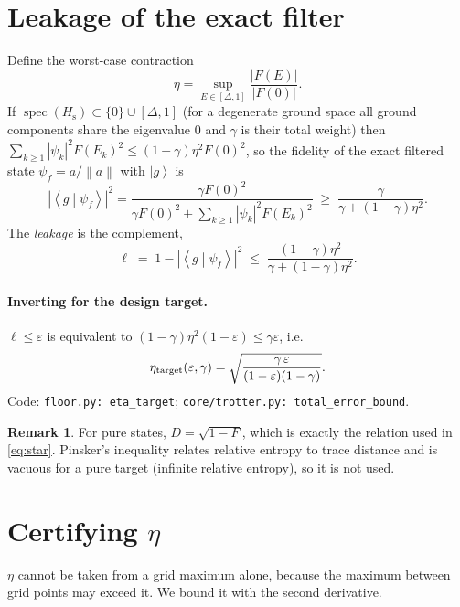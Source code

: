 \documentclass[11pt]{article}
\theoremstyle{definition}
\newtheorem*{remark}{Remark}
\newcommand{\norm}[1]{\left\lVert #1\right\rVert}
\newcommand{\abs}[1]{\left\lvert #1\right\rvert}
\newcommand{\ket}[1]{\left\lvert #1\right\rangle}
\newcommand{\braket}[2]{\left\langle #1 \middle| #2\right\rangle}
\newcommand{\Hs}{H_{\mathrm s}}
\newcommand{\eps}{\varepsilon}
\newcommand{\code}[1]{\texttt{#1}}
\begin{document}
\section{Leakage of the exact filter}\label{sec:leak}
Define the worst-case contraction
\begin{equation}
  \eta=\sup_{E\in[\Delta,1]}\frac{\abs{F(E)}}{\abs{F(0)}} .
\end{equation}
If $\operatorname{spec}(\Hs)\subset\{0\}\cup[\Delta,1]$ (for a degenerate ground space all ground components share the eigenvalue $0$ and $\gamma$ is their total weight) then $\sum_{k\ge1}\abs{\psi_k}^2F(E_k)^2\le(1-\gamma)\eta^2F(0)^2$, so the
fidelity of the exact filtered state $\psi_f=a/\norm a$ with $\ket g$ is
\begin{equation}
  \abs{\braket g{\psi_f}}^2=\frac{\gamma F(0)^2}{\gamma F(0)^2+\sum_{k\ge1}\abs{\psi_k}^2F(E_k)^2}
  \;\ge\;\frac{\gamma}{\gamma+(1-\gamma)\eta^2}.
\end{equation}
The \emph{leakage} is the complement,
\begin{equation}\label{eq:leak}
  \ell\;=\;1-\abs{\braket g{\psi_f}}^2\;\le\;\frac{(1-\gamma)\eta^2}{\gamma+(1-\gamma)\eta^2}.
\end{equation}
\paragraph{Inverting for the design target.} $\ell\le\eps$ is equivalent to $(1-\gamma)\eta^2(1-\eps)\le\gamma\eps$, i.e.
\begin{equation}\label{eq:etat}
  \eta_{\rm target}(\eps,\gamma)=\sqrt{\frac{\gamma\,\eps}{(1-\eps)(1-\gamma)}} .
\end{equation}
Code: \code{floor.py: eta\_target}; \code{core/trotter.py: total\_error\_bound}.

\begin{remark}
For pure states, $D=\sqrt{1-F}$, which is exactly the relation used in \eqref{eq:star}. Pinsker's inequality relates
relative entropy to trace distance and is vacuous for a pure target (infinite relative entropy), so it is not used.
\end{remark}

\section{Certifying $\eta$}\label{sec:cert}
$\eta$ cannot be taken from a grid maximum alone, because the maximum between grid points may exceed it. We bound it with
the second derivative.
\end{document}
